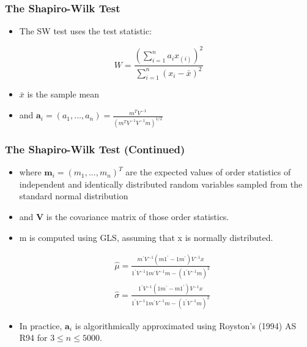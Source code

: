 
\begin{frame}
\frametitle{The Shapiro-Wilk Test}
\begin{itemize}
    \item The SW test uses the test statistic:
\end{itemize}
\vspace{.25in}
$$
W=\frac{(\sum_{i=1}^n a_i x_{(i)})^2}{\sum_{i=1}^n(x_i-\bar{x})^2}
$$
\begin{itemize}
    \item $\bar{x}$ is the sample mean
    \item and $\boldsymbol{a}_i=(a_1, \ldots, a_n)=\frac{m^T V^{-1}}{(m^T V^{-1} V^{-1} m)^{1 / 2}}$
\end{itemize}
\end{frame}



\begin{frame}
\frametitle{The Shapiro-Wilk Test (Continued)}
\begin{itemize}
    \item where $\boldsymbol{m}_i=(m_1, \ldots, m_n)^T$ are the expected values of order statistics of independent and identically distributed random variables sampled from the standard normal distribution
    \item and $\boldsymbol{V}$ is the covariance matrix of those order statistics.
    \item m is computed using GLS, assuming that x is normally distributed.
\end{itemize}
$$
\begin{aligned}
& \hat{\mu}=\frac{m^{\prime} V^{-1}(m 1^{\prime}-1 m^{\prime}) V^{-1} x}{1^{\prime} V^{-1} 1 m^{\prime} V^{-1} m-(1^{\prime} V^{-1} m)^2} \\
& \hat{\sigma}=\frac{1^{\prime} V^{-1}(1 m^{\prime}-m 1^{\prime}) V^{-1} x}{1^{\prime} V^{-1} 1 m^{\prime} V^{-1} m-(1^{\prime} V^{-1} m)^2}
\end{aligned}
$$
\begin{itemize}
    \item In practice, $\boldsymbol{a}_i$ is algorithmically approximated using Royston's (1994) AS R94 for $3 \leq n \leq 5000$.
\end{itemize}
\end{frame}

